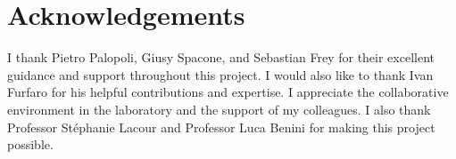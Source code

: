 \section*{Acknowledgements}
\bigskip
\noindent I thank Pietro Palopoli, Giusy Spacone, and Sebastian Frey for 
their excellent guidance and support throughout this project. 
I would also like to thank Ivan Furfaro for his helpful 
contributions and expertise. I appreciate the collaborative environment 
in the laboratory and the support of my colleagues. I also thank
Professor Stéphanie Lacour and Professor Luca Benini for making this
project possible.